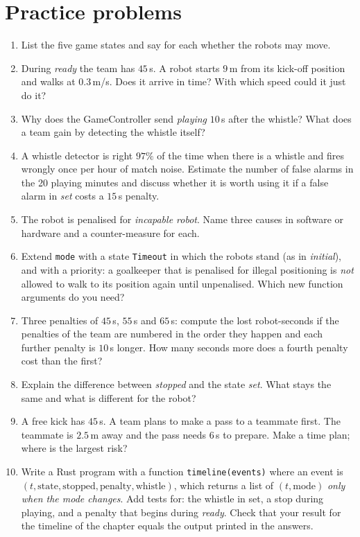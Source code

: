 \section*{Practice problems}
\begin{enumerate}[label=\textbf{\thechapter.\arabic*}]
  \item List the five game states and say for each whether the robots may move.
  \item During \emph{ready} the team has $45$\,s. A robot starts $9$\,m from its kick-off position and walks at $0.3$\,m/s. Does it arrive in time? With which speed could it just do it?
  \item Why does the GameController send \emph{playing} $10$\,s after the whistle? What does a team gain by detecting the whistle itself?
  \item A whistle detector is right $97\%$ of the time when there is a whistle and fires wrongly once per hour of match noise. Estimate the number of false alarms in the 20 playing minutes and discuss whether it is worth using it if a false alarm in \emph{set} costs a $15$\,s penalty.
  \item The robot is penalised for \emph{incapable robot}. Name three causes in software or hardware and a counter-measure for each.
  \item Extend \verb!mode! with a state \verb!Timeout! in which the robots stand (as in \emph{initial}), and with a priority: a goalkeeper that is penalised for illegal positioning is \emph{not} allowed to walk to its position again until unpenalised. Which new function arguments do you need?
  \item Three penalties of $45$\,s, $55$\,s and $65$\,s: compute the lost robot-seconds if the penalties of the team are numbered in the order they happen and each further penalty is $10$\,s longer. How many seconds more does a fourth penalty cost than the first?
  \item Explain the difference between \emph{stopped} and the state \emph{set}. What stays the same and what is different for the robot?
  \item A free kick has $45$\,s. A team plans to make a pass to a teammate first. The teammate is $2.5$\,m away and the pass needs $6$\,s to prepare. Make a time plan; where is the largest risk?
  \item[\textbf{\thechapter.10}$\star$] Write a Rust program with a function \verb!timeline(events)! where an event is $(t,\text{state},\text{stopped},\text{penalty},\text{whistle})$, which returns a list of $(t,\text{mode})$ \emph{only when the mode changes}. Add tests for: the whistle in set, a stop during playing, and a penalty that begins during \emph{ready}. Check that your result for the timeline of the chapter equals the output printed in the answers.
\end{enumerate}
